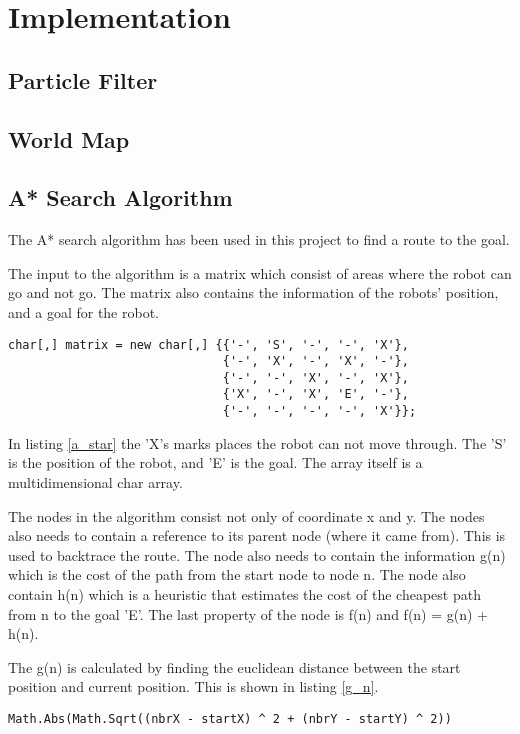 \chapter{Implementation}
\label{chp:impl}

\section{Particle Filter}
\section{World Map}
\section{A* Search Algorithm}

The A* search algorithm has been used in this project to find a route to the goal. 

The input to the algorithm is a matrix which consist of areas where the robot  can go and not go. The matrix also contains the information of the robots' position, and a goal for the robot.

\begin{lstlisting}[caption={An example of the matrix which the A* uses as input.}, label=a_star]
char[,] matrix = new char[,] {{'-', 'S', '-', '-', 'X'},
							  {'-', 'X', '-', 'X', '-'},
							  {'-', '-', 'X', '-', 'X'},
							  {'X', '-', 'X', 'E', '-'},
							  {'-', '-', '-', '-', 'X'}};
\end{lstlisting}

In listing \ref{a_star} the 'X's marks places the robot can not move through. The 'S' is the position of the robot, and 'E' is the goal. The array itself is a multidimensional char array.

The nodes in the algorithm consist not only of coordinate x and y. The nodes also needs to contain a reference to its parent node (where it came from). This is used to backtrace the route. The node also needs to contain the information g(n) which is the cost of the path from the start node to node n. The node also contain h(n) which is a heuristic that estimates the cost of the cheapest path from n to the goal 'E'. The last property of the node is f(n) and f(n) = g(n) + h(n).

The g(n) is calculated by finding the euclidean distance between the start position and current position. This is shown in listing \ref{g_n}.

\begin{lstlisting}[caption={Calculation of g(n).}, label=g_n]
Math.Abs(Math.Sqrt((nbrX - startX) ^ 2 + (nbrY - startY) ^ 2))
\end{lstlisting}

